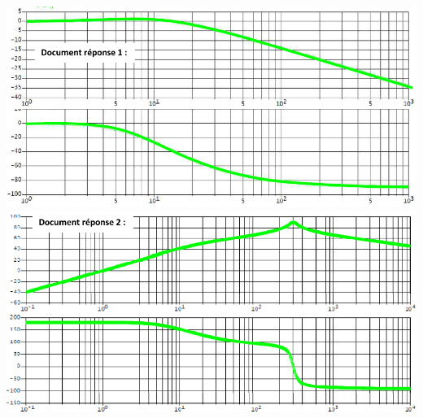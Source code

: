 \documentclass[10pt,fleqn]{article} %
\begin{document}
\begin{center}
\includegraphics[width=\linewidth]{images/img_08}
\includegraphics[width=\linewidth]{images/img_09}
\end{center}
\end{document}
